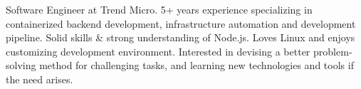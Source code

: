 \par{
Software Engineer at Trend Micro. 5+ years experience specializing in containerized backend development, infrastructure automation and development pipeline. Solid skills \& strong understanding of Node.js. Loves Linux and enjoys customizing development environment. Interested in devising a better problem‐solving method for challenging tasks, and learning new technologies and tools if the need arises.
}
